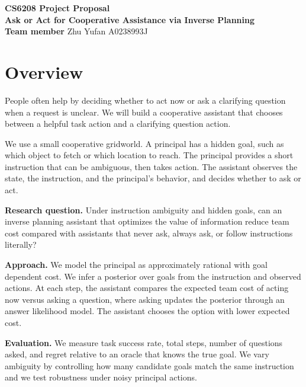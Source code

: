\documentclass[10pt,twocolumn]{article}
\begin{document}
\begin{center}
{\Large \textbf{CS6208 Project Proposal}}\\
\vspace{2pt}
{\large \textbf{Ask or Act for Cooperative Assistance via Inverse Planning}}\\
\vspace{4pt}
\textbf{Team member} Zhu Yufan A0238993J
\end{center}

\vspace{-6pt}

\section*{Overview}
People often help by deciding whether to act now or ask a clarifying question when a request is unclear.
We will build a cooperative assistant that chooses between a helpful task action and a clarifying question action.

We use a small cooperative gridworld. A principal has a hidden goal, such as which object to fetch or which location to reach.
The principal provides a short instruction that can be ambiguous, then takes action.
The assistant observes the state, the instruction, and the principal's behavior, and decides whether to ask or act.

\textbf{Research question.}
Under instruction ambiguity and hidden goals, can an inverse planning assistant that optimizes the value of information reduce team cost compared with assistants that never ask, always ask, or follow instructions literally?

\textbf{Approach.}
We model the principal as approximately rational with goal dependent cost.
We infer a posterior over goals from the instruction and observed actions.
At each step, the assistant compares the expected team cost of acting now versus asking a question, where asking updates the posterior through an answer likelihood model.
The assistant chooses the option with lower expected cost.

\textbf{Evaluation.}
We measure task success rate, total steps, number of questions asked, and regret relative to an oracle that knows the true goal.
We vary ambiguity by controlling how many candidate goals match the same instruction and we test robustness under noisy principal actions.
\end{document}
